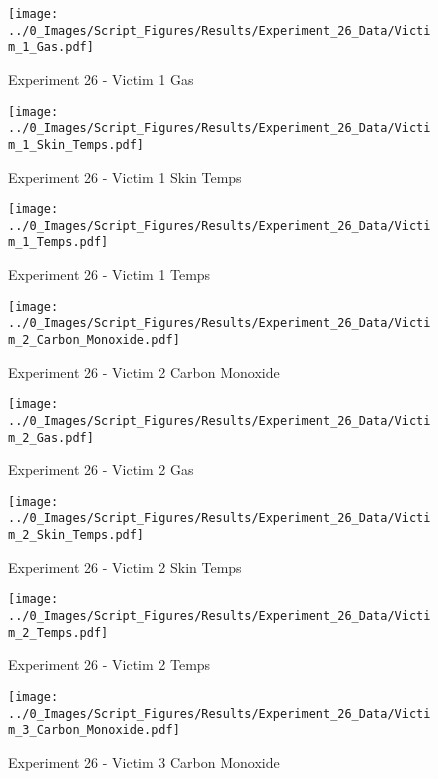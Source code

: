	\begin{figure}[H]
		\centering
		\texttt{[image: ../0\_Images/Script\_Figures/Results/Experiment\_26\_Data/Victim\_1\_Gas.pdf]}
		\caption[]{Experiment 26 - Victim 1 Gas}
	\end{figure}
 
	\clearpage

	\begin{figure}[H]
		\centering
		\texttt{[image: ../0\_Images/Script\_Figures/Results/Experiment\_26\_Data/Victim\_1\_Skin\_Temps.pdf]}
		\caption[]{Experiment 26 - Victim 1 Skin Temps}
	\end{figure}
 

	\begin{figure}[H]
		\centering
		\texttt{[image: ../0\_Images/Script\_Figures/Results/Experiment\_26\_Data/Victim\_1\_Temps.pdf]}
		\caption[]{Experiment 26 - Victim 1 Temps}
	\end{figure}
 
	\clearpage

	\begin{figure}[H]
		\centering
		\texttt{[image: ../0\_Images/Script\_Figures/Results/Experiment\_26\_Data/Victim\_2\_Carbon\_Monoxide.pdf]}
		\caption[]{Experiment 26 - Victim 2 Carbon Monoxide}
	\end{figure}
 

	\begin{figure}[H]
		\centering
		\texttt{[image: ../0\_Images/Script\_Figures/Results/Experiment\_26\_Data/Victim\_2\_Gas.pdf]}
		\caption[]{Experiment 26 - Victim 2 Gas}
	\end{figure}
 
	\clearpage

	\begin{figure}[H]
		\centering
		\texttt{[image: ../0\_Images/Script\_Figures/Results/Experiment\_26\_Data/Victim\_2\_Skin\_Temps.pdf]}
		\caption[]{Experiment 26 - Victim 2 Skin Temps}
	\end{figure}
 

	\begin{figure}[H]
		\centering
		\texttt{[image: ../0\_Images/Script\_Figures/Results/Experiment\_26\_Data/Victim\_2\_Temps.pdf]}
		\caption[]{Experiment 26 - Victim 2 Temps}
	\end{figure}
 
	\clearpage

	\begin{figure}[H]
		\centering
		\texttt{[image: ../0\_Images/Script\_Figures/Results/Experiment\_26\_Data/Victim\_3\_Carbon\_Monoxide.pdf]}
		\caption[]{Experiment 26 - Victim 3 Carbon Monoxide}
	\end{figure}
 

